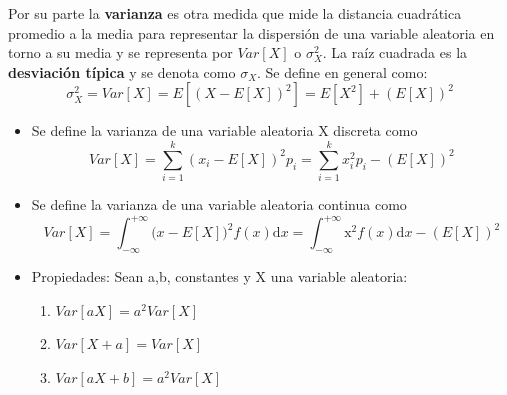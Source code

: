 \documentclass[11 pt]{article}
\begin{document}
Por su parte la {\bf varianza} es otra medida que mide la distancia cuadrática promedio a la media para representar la dispersión de una variable aleatoria en torno a su media y se representa por $Var[X]$ o $\sigma^2_X$. La raíz cuadrada es la {\bf desviación típica} y se denota como $\sigma_X$. Se define en general como:
\begin{displaymath}
\sigma^2_X=Var[X]=E[(X-E[X])^2]=E[X^2]+(E[X])^2
\end{displaymath}
\begin{itemize}
\item Se define la varianza de una variable aleatoria X discreta como 
\begin{displaymath}
Var[X]=\sum_{i=1}^{k}(x_i-E[X])^2p_i=\sum_{i=1}^{k} x_i^2p_i-(E[X])^2
\end{displaymath}
\item Se define la varianza de una variable aleatoria continua como
\begin{displaymath}
Var[X]=\int_{-\infty}^{+\infty} \mathrm (x-E[X])^2f(x)\mathrm{d}x=\int_{-\infty}^{+\infty} \mathrm x^2f(x)\mathrm{d}x - (E[X])^2
\end{displaymath}
\item Propiedades: Sean a,b, constantes y X una variable aleatoria: 
\begin{enumerate}
	\item $Var[aX]=a^2Var[X]$
	\item $Var[X + a]=Var[X]$
	\item $Var[aX + b]=a^2Var[X]$
\end{enumerate}
\end{itemize}

		
\end{document}
